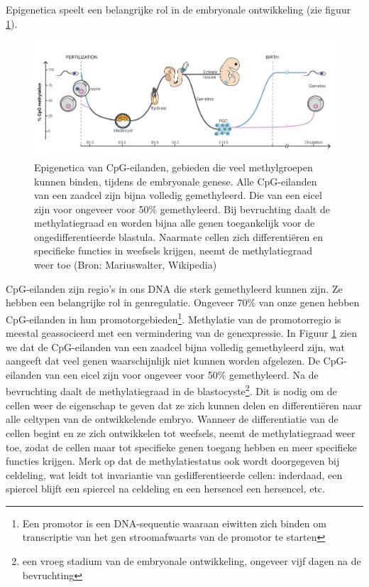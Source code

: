 \documentclass[
  11pt,
]{book}
\begin{document}
Epigenetica speelt een belangrijke rol in de embryonale ontwikkeling (zie figuur \ref{fig:epiEmbryo}).



\begin{figure}

{\centering \includegraphics[width=1\linewidth]{./figs/DNA_methylation_reprogramming} 

}

\caption{Epigenetica van CpG-eilanden, gebieden die veel methylgroepen kunnen binden, tijdens de embryonale genese. Alle CpG-eilanden van een zaadcel zijn bijna volledig gemethyleerd. Die van een eicel zijn voor ongeveer voor 50\% gemethyleerd. Bij bevruchting daalt de methylatiegraad en worden bijna alle genen toegankelijk voor de ongedifferentieerde blastula. Naarmate cellen zich differentiëren en specifieke functies in weefsels krijgen, neemt de methylatiegraad weer toe (Bron: Mariuswalter, Wikipedia)}\label{fig:epiEmbryo}
\end{figure}

CpG-eilanden zijn regio's in ons DNA die sterk gemethyleerd kunnen zijn. Ze hebben een belangrijke rol in genregulatie. Ongeveer 70\% van onze genen hebben CpG-eilanden in hun promotorgebieden\footnote{Een promotor is een DNA-sequentie waaraan eiwitten zich binden om transcriptie van het gen stroomafwaarts van de promotor te starten}. Methylatie van de promotorregio is meestal geassocieerd met een vermindering van de genexpressie. In Figuur \ref{fig:epiEmbryo} zien we dat de CpG-eilanden van een zaadcel bijna volledig gemethyleerd zijn, wat aangeeft dat veel genen waarschijnlijk niet kunnen worden afgelezen. De CpG-eilanden van een eicel zijn voor ongeveer voor 50\% gemethyleerd. Na de bevruchting daalt de methylatiegraad in de blastocyste\footnote{een vroeg stadium van de embryonale ontwikkeling, ongeveer vijf dagen na de bevruchting}. Dit is nodig om de cellen weer de eigenschap te geven dat ze zich kunnen delen en differentiëren naar alle celtypen van de ontwikkelende embryo. Wanneer de differentiatie van de cellen begint en ze zich ontwikkelen tot weefsels, neemt de methylatiegraad weer toe, zodat de cellen maar tot specifieke genen toegang hebben en meer specifieke functies krijgen. Merk op dat de methylatiestatus ook wordt doorgegeven bij celdeling, wat leidt tot invariantie van gedifferentieerde cellen: inderdaad, een spiercel blijft een spiercel na celdeling en een hersencel een hersencel, etc.
\end{document}

